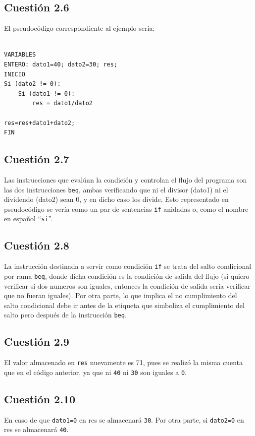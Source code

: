 \documentclass[11pt]{article}
\begin{document}
\begin{large}
\begin{flushleft}
\subsection*{Cuestión 2.6}
El pseudocódigo correspondiente al ejemplo sería:

\begin{listing}[h]
\begin{verbatim}

VARIABLES
ENTERO: dato1=40; dato2=30; res;
INICIO
Si (dato2 != 0):
    Si (dato1 != 0):
        res = dato1/dato2

res=res+dato1+dato2;
FIN

\end{verbatim}
\end{listing}


\subsection*{Cuestión 2.7}
Las instrucciones que evalúan la condición y controlan el flujo del programa son las dos instrucciones \texttt{beq}, ambas verificando que ni el divisor (dato1) ni el dividendo (dato2) sean 0, y en dicho caso los divide. Esto representado en pseudocódigo se vería como un par de sentencias \texttt{if} anidadas o, como el nombre en español ``\texttt{si}''.


\subsection*{Cuestión 2.8}
La instrucción destinada a servir como condición \texttt{if} se trata del salto condicional por rama \texttt{beq}, donde dicha condición es la condición de salida del flujo (si quiero verificar si dos numeros son iguales, entonces la condición de salida sería verificar que no fueran iguales). Por otra parte, lo que implica el no cumplimiento del salto condicional debe ir antes de la etiqueta que simboliza el cumplimiento del salto pero después de la instrucción \texttt{beq}.

\subsection*{Cuestión 2.9}
El valor almacenado en \texttt{res} nuevamente es 71, pues se realizó la misma cuenta que en el código anterior, ya que ni \texttt{40} ni \texttt{30} son iguales a \texttt{0}.

\subsection*{Cuestión 2.10}
En caso de que \texttt{dato1=0} en res se almacenará \texttt{30}. Por otra parte, si \texttt{dato2=0} en res se almacenará \texttt{40}.



\end{flushleft}
\end{large}
\end{document}
